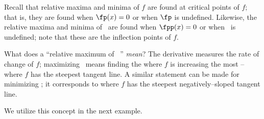 Recall that relative maxima and minima of $f$ are found at critical points of $f$; that is, they are found when $\fp(x)=0$ or when $\fp$ is undefined. Likewise, the relative maxima and minima of \fp\ are found when $\fpp(x)=0$ or when \fpp\ is undefined; note that these are the inflection points of $f$. 

What does a ``relative maximum of \fp\ '' \textit{mean}? The derivative measures the rate of change of $f$; maximizing \fp\ means finding the where $f$ is increasing the most -- where $f$ has the steepest tangent line. A similar statement can be made for minimizing \fp; it corresponds to where $f$ has the steepest negatively--sloped tangent line.

We utilize this concept in the next example.

